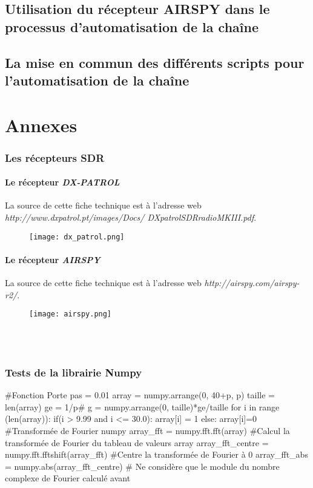 \documentclass[12pt,fleqn]{book} %
\begin{document}
\chapter{Utilisation du récepteur AIRSPY dans le processus d'automatisation de la chaîne}

\chapter{La mise en commun des différents scripts pour l'automatisation de la chaîne}





\setcounter{part}{-5}
\part{Annexes}
\section{Les récepteurs SDR}
\subsection{Le récepteur \emph{DX-PATROL}}
La source de cette fiche technique est à l'adresse web \emph{http://www.dxpatrol.pt/images/Docs/ DXpatrolSDRradioMKIII.pdf}.
\begin{figure}[H]
	\centering
	\texttt{[image: dx\_patrol.png]}
 \end{figure}
\subsection{Le récepteur \emph{AIRSPY}}
La source de cette fiche technique est à l'adresse web \emph{http://airspy.com/airspy-r2/}.
 \begin{figure}[H]
	\centering
	\texttt{[image: airspy.png]}
 \end{figure}
~\\\\
\section{Tests de la librairie Numpy}
\begin{python}
 #Fonction Porte
 pas = 0.01
 array = numpy.arrange(0, 40+p, p)
 taille = len(array)
 ge = 1/p#
 g = numpy.arrange(0, taille)*ge/taille
 for i in range (len(array)):
     if(i > 9.99 and i <= 30.0):
          array[i] = 1
      else:
          array[i]=0
 #Transformée de Fourier numpy
 array_fft = numpy.fft.fft(array) #Calcul la transformée de Fourier du tableau de valeurs array
 array_fft_centre = numpy.fft.fftshift(array_fft) #Centre la transformée de Fourier à 0
 array_fft_abs = numpy.abs(array_fft_centre) # Ne considère que le module du nombre complexe de Fourier calculé avant
\end{python}
\setcounter{part}{-6}
\end{document}

